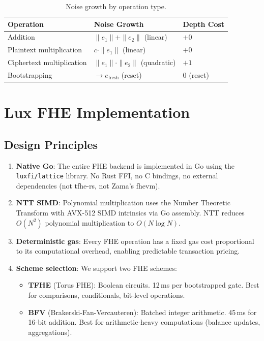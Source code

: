 \documentclass[11pt,a4paper]{article}
\begin{document}
\begin{table}[ht]
\centering
\caption{Noise growth by operation type.}
\label{tab:noise-growth}
\begin{tabular}{lll}
\toprule
\textbf{Operation} & \textbf{Noise Growth} & \textbf{Depth Cost} \\
\midrule
Addition & $\|e_1\| + \|e_2\|$ (linear) & $+0$ \\
Plaintext multiplication & $c \cdot \|e_1\|$ (linear) & $+0$ \\
Ciphertext multiplication & $\|e_1\| \cdot \|e_2\|$ (quadratic) & $+1$ \\
Bootstrapping & $\to e_{\text{fresh}}$ (reset) & $0$ (reset) \\
\bottomrule
\end{tabular}
\end{table}

\section{Lux FHE Implementation}
\label{sec:implementation}

\subsection{Design Principles}

\begin{enumerate}[leftmargin=2em]
  \item \textbf{Native Go}: The entire FHE backend is implemented in Go using the
        \texttt{luxfi/lattice} library. No Rust FFI, no C bindings, no external
        dependencies (not tfhe-rs, not Zama's fhevm).
  \item \textbf{NTT SIMD}: Polynomial multiplication uses the Number Theoretic
        Transform with AVX-512 SIMD intrinsics via Go assembly. NTT reduces
        $O(N^2)$ polynomial multiplication to $O(N \log N)$.
  \item \textbf{Deterministic gas}: Every FHE operation has a fixed gas cost
        proportional to its computational overhead, enabling predictable transaction
        pricing.
  \item \textbf{Scheme selection}: We support two FHE schemes:
        \begin{itemize}
          \item \textbf{TFHE} (Torus FHE): Boolean circuits. 12\,ms per bootstrapped
                gate. Best for comparisons, conditionals, bit-level operations.
          \item \textbf{BFV} (Brakerski-Fan-Vercauteren): Batched integer arithmetic.
                45\,ms for 16-bit addition. Best for arithmetic-heavy computations
                (balance updates, aggregations).
        \end{itemize}
\end{enumerate}
\end{document}
